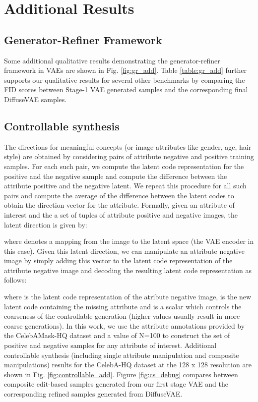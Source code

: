 \documentclass[10pt]{article} \usepackage[accepted]{tmlr}
\begin{document}
\newpage
\section{Additional Results}
\label{app:appendix_f}
\subsection{Generator-Refiner Framework}
Some additional qualitative results demonstrating the generator-refiner framework in VAEs are shown in Fig. \ref{fig:gr_add}. Table \ref{table:gr_add} further supports our qualitative results for several other benchmarks by comparing the FID scores between Stage-1 VAE generated samples and the corresponding final DiffuseVAE samples.

\subsection{Controllable synthesis}
\label{sec:app_controllable}
The directions for meaningful concepts (or image attributes like gender, age, hair style) are obtained by considering pairs of attribute negative and positive training samples. For each such pair, we compute the latent code representation for the positive and the negative sample and compute the difference between the attribute positive and the negative latent. We repeat this procedure for all such pairs and compute the average of the difference between the latent codes to obtain the direction vector for the attribute. Formally, given an attribute of interest  and the a set of tuples  of attribute positive and negative images, the latent direction  is given by:


where  denotes a mapping from the image to the latent space (the VAE encoder in this case). Given this latent direction, we can manipulate an attribute negative image by simply adding this vector to the latent code representation of the attribute negative image and decoding the resulting latent code representation as follows:

where  is the latent code representation of the atribute negative image,  is the new latent code containing the missing attribute and  is a scalar which controls the coarseness of the controllable generation (higher values usually result in more coarse generations).
In this work, we use the attribute annotations provided by the CelebAMask-HQ dataset \citep{CelebAMask-HQ} and a value of N=100 to construct the set of positive and negative samples for any attribute of interest. Additional controllable synthesis (including single attribute manipulation and composite manipulations) results for the CelebA-HQ dataset at the 128 x 128 resolution are shown in Fig. \ref{fig:controllable_add}. Figure \ref{fig:cs_debug} compares between composite edit-based samples generated from our first stage VAE and the corresponding refined samples generated from DiffuseVAE.
\end{document}
